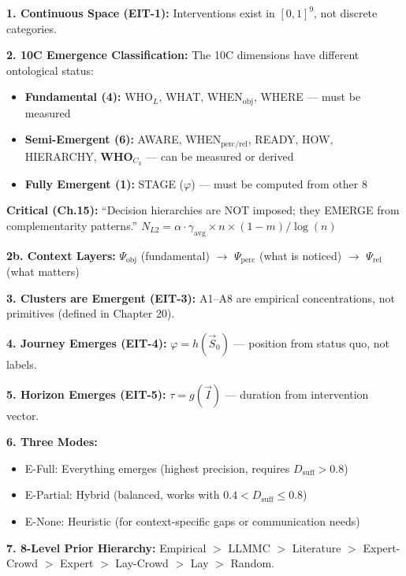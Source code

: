 \begin{tcolorbox}[colback=blue!5!white, colframe=blue!75!black,
    title=\textbf{Key Takeaways: Emergent Intervention Theory}]

\textbf{1. Continuous Space (EIT-1):} Interventions exist in $[0,1]^9$, not discrete categories.

\textbf{2. 10C Emergence Classification:} The 10C dimensions have different ontological status:
\begin{itemize}[nosep]
    \item \textbf{Fundamental (4):} WHO$_L$, WHAT, WHEN$_{\text{obj}}$, WHERE --- must be measured
    \item \textbf{Semi-Emergent (6):} AWARE, WHEN$_{\text{perc/rel}}$, READY, HOW, HIERARCHY, \textbf{WHO$_{C_k}$} --- can be measured or derived
    \item \textbf{Fully Emergent (1):} STAGE ($\varphi$) --- must be computed from other 8
\end{itemize}

\textbf{Critical (Ch.15):} ``Decision hierarchies are NOT imposed; they EMERGE from complementarity patterns.'' $N_{L2} = \alpha \cdot \gamma_{\text{avg}} \times n \times (1-m) / \log(n)$

\textbf{2b. Context Layers:} $\Psi_{\text{obj}}$ (fundamental) $\rightarrow$ $\Psi_{\text{perc}}$ (what is noticed) $\rightarrow$ $\Psi_{\text{rel}}$ (what matters)

\textbf{3. Clusters are Emergent (EIT-3):} A1--A8 are empirical concentrations, not primitives (defined in Chapter 20).

\textbf{4. Journey Emerges (EIT-4):} $\varphi = h(\vec{S}_0)$ --- position from status quo, not labels.

\textbf{5. Horizon Emerges (EIT-5):} $\tau = g(\vec{I})$ --- duration from intervention vector.

\textbf{6. Three Modes:}
\begin{itemize}[nosep]
    \item E-Full: Everything emerges (highest precision, requires $D_{\text{suff}} > 0.8$)
    \item E-Partial: Hybrid (balanced, works with $0.4 < D_{\text{suff}} \leq 0.8$)
    \item E-None: Heuristic (for context-specific gaps or communication needs)
\end{itemize}

\textbf{7. 8-Level Prior Hierarchy:} Empirical $>$ LLMMC $>$ Literature $>$ Expert-Crowd $>$ Expert $>$ Lay-Crowd $>$ Lay $>$ Random.


\end{tcolorbox}
